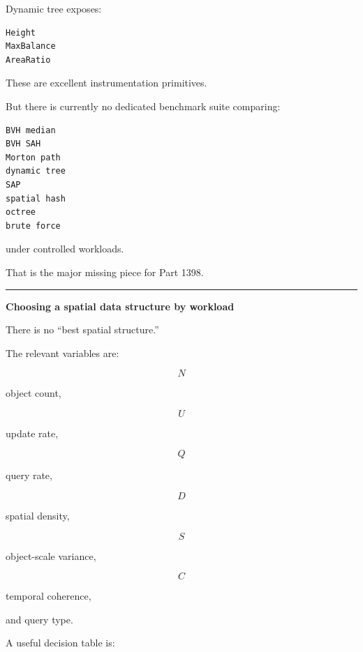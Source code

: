 Dynamic tree exposes:

\begin{verbatim}
Height
MaxBalance
AreaRatio
\end{verbatim}

These are excellent instrumentation primitives.

But there is currently no dedicated benchmark suite comparing:

\begin{verbatim}
BVH median
BVH SAH
Morton path
dynamic tree
SAP
spatial hash
octree
brute force
\end{verbatim}

under controlled workloads.

That is the major missing piece for Part 1398.

\begin{center}\rule{0.5\linewidth}{0.5pt}\end{center}

\textbf{Choosing a spatial data structure by workload}

There is no ``best spatial structure.''

The relevant variables are:

\[
N
\]

object count,

\[
U
\]

update rate,

\[
Q
\]

query rate,

\[
D
\]

spatial density,

\[
S
\]

object-scale variance,

\[
C
\]

temporal coherence,

and query type.

A useful decision table is:

